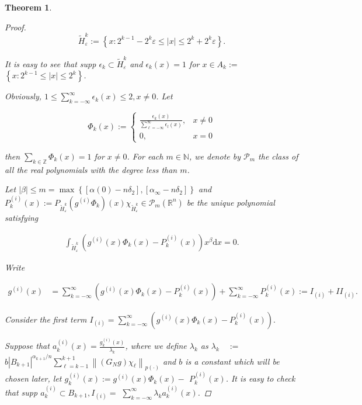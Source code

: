 \documentclass[oneside,reqno]{amsart}
\newtheorem{theorem}{Theorem}[section]
\numberwithin{equation}{section}
\theoremstyle{definition}
\begin{document}
\begin{theorem}
\begin{proof}
\begin{equation*}
\widetilde{H}^k_{ \varepsilon}:=\left\{x: 2^{k-1}-2^{k} \varepsilon \leq |x| \leq  2^{k}+2^{k} \varepsilon\right\} . 
\end{equation*}


It is easy to see that supp $\epsilon  _{k} \subset \widetilde{H}^k_{ \varepsilon}$ and $\epsilon  _{k}(x)=1$ for $x \in A_{k}:=$ $\left\{x: 2^{k-1} \leq |x| \leq  2^{k}\right\}$.


Obviously, $1 \leq  \sum_{k=-\infty}^{\infty} \epsilon  _{k}(x) \leq  2, x \neq 0$. Let

\[
\Phi_{k}(x):= \begin{cases}\frac{\epsilon  _{k}(x)}{\sum_{\ell=-\infty }^{\infty} \epsilon  _{l}(x)}, & x \neq 0  \\ 0, & x=0\end{cases}
\]

then $\sum_{k\in \mathbb{Z}} \Phi_{k}(x)=1$ for $x \neq 0$. For each $m \in \mathbb{N}$, we denote by $\mathcal{P}_{m}$ the class of all the real polynomials with the degree less than $m$.


Let $|\beta| \leq  m=\max \left\{\left[\alpha(0)-n \delta_{2}\right],\left[\alpha_{\infty}-n \delta_{2}\right]\right\}$ and  $P^{(i)}_{k}(x):=P_{\widetilde{H}^k_{ \varepsilon}}\left(g^{(i)} \Phi_{k}\right)(x) \chi_{\widetilde{H}^k_{ \varepsilon}} \in \mathcal{P}_{m}\left(\mathbb{R}^{n}\right)$ be the unique polynomial satisfying


\begin{gather*}
\int_{\widetilde{H}^k_{ \varepsilon}}\left(g^{(i)}(x) \Phi_{k}(x)-P^{(i)}_{k}(x)\right) x^{\beta} \mathrm{d} x=0.
\end{gather*}


Write


\begin{align*}
g^{(i)}(x) & =\sum_{k=-\infty}^{\infty}\left(g^{(i)}(x) \Phi_{k}(x)-P^{(i)}_{k}(x)\right)+\sum_{k=-\infty}^{\infty} P^{(i)}_{k}(x)  :=I_{(i)}+I I_{(i)}. 
\end{align*}

Consider the first term $I_{(i)}=\sum_{k=-\infty}^{\infty}\left(g^{(i)}(x) \Phi_{k}(x)-P^{(i)}_{k}(x)\right).$


Suppose that $a_{k}^{(i)}(x)=\frac{g_{k}^{(i)}(x)} {\lambda_{k}}$, where we define $\lambda_k$ as $\lambda_{k} \quad:=$ $b\left|B_{k+1}\right|^{\alpha_{k+1} / n} \sum_{\ell=k-1}^{k+1}\left\|\left(G_{N}g \right) \chi_\ell \right\|_{{p(\cdot)}}$ and $b$ is a constant which will be chosen later, let $g_{k}^{(i)}(x):=g^{(i)}(x) \Phi_{k}(x)-$ $P^{(i)}_{k}(x)$. It is easy to check that  supp $a_{k}^{(i)} \subset B_{k+1}, I_{(i)}=$ $\sum_{k=-\infty}^{\infty} \lambda_{k} a_{k}^{(i)}(x)$.


\end{proof}
\end{theorem}
\end{document}
